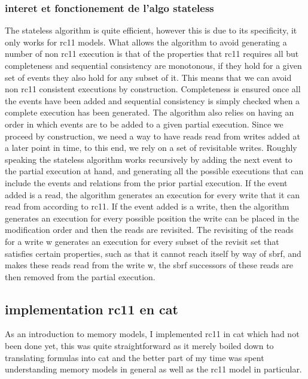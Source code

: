 \documentclass[a4,12pt]{article}
\begin{document}
\subsubsection{interet et fonctionement de l'algo stateless}

The stateless algorithm is quite efficient, however this is due to its specificity, it only works for rc11 models. What allows the algorithm to avoid generating a number of non rc11 execution is that of the properties that rc11 requires all but completeness and sequential consistency are monotonous, if they hold for a given set of events they also hold for any subset of it. This means that we can avoid non rc11 consistent executions by construction. Completeness is ensured once all the events have been added and sequential consistency is simply checked when a complete execution has been generated. The algorithm also relies on having an order in which events are to be added to a given partial execution. Since we proceed by construction, we need a way to have reads read from writes added at a later point in time, to this end, we rely on a set of revisitable writes.
Roughly speaking the stateless algorithm works recursively by adding the next event to the partial execution at hand, and generating all the possible executions that can include the events and relations from the prior partial execution. If the event added is a read, the algorithm generates an execution for every write that it can read from according to rc11. If the event added is a write, then the algorithm generates an execution for every possible position the write can be placed in the modification order and then the reads are revisited. The revisiting of the reads for a write w generates an execution for every subset of the revisit set that satisfies certain properties, such as that it cannot reach itself by way of sbrf, and makes these reads read from the write w, the sbrf successors of these reads are then removed from the partial execution.

\subsection{implementation rc11 en cat}

As an introduction to memory models, I implemented rc11 in cat which had not been done yet, this was quite straightforward as it merely boiled down to translating formulas into cat and the better part of my time was spent understanding memory models in general as well as the rc11 model in particular.
\end{document}
